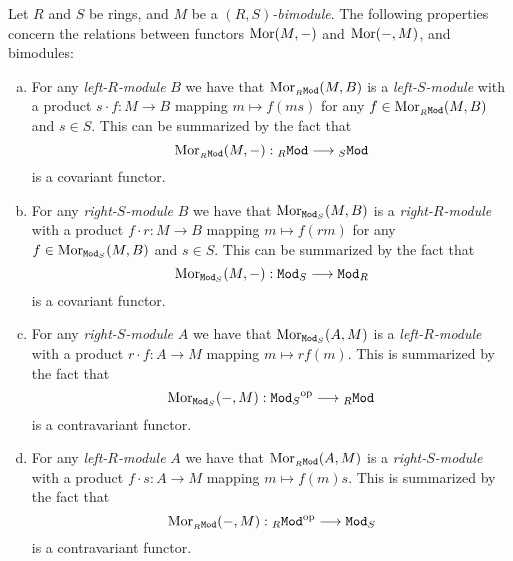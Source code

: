 \begin{proposition}
    \label{prop:hom-functor-and-bimodules}
    Let \(R\) and \(S\) be rings, and \(M\) be a \emph{\((R, S)\)-bimodule}. The
    following properties concern the relations between functors \(\operatorname{Mor}(M, -)\) and
    \(\operatorname{Mor}(-, M)\), and bimodules:
    \begin{enumerate}[(a)]\setlength\itemsep{0em}
        \item For any \emph{left-\(R\)-module} \(B\) we have that
              \(\operatorname{Mor}_{{{}_{R}\texttt{Mod}}}(M, B)\) is a \emph{left-\(S\)-module} with a product
              \(s \cdot f: M \to B\) mapping \(m \mapsto f(m s)\) for any
              \(f \in \operatorname{Mor}_{{{}_{R}\texttt{Mod}}}(M, B)\) and \(s \in S\). This can be summarized by the
              fact that
              \[
                  \operatorname{Mor}_{{{}_{R}\texttt{Mod}}}(M, -): {{}_{R}\texttt{Mod}} \longrightarrow {{}_{S}\texttt{Mod}}
              \]
              is a covariant functor.

        \item For any \emph{right-\(S\)-module} \(B\) we have that
              \(\operatorname{Mor}_{{\texttt{Mod}_{S}}}(M, B)\) is a \emph{right-\(R\)-module} with a product
              \(f \cdot r: M \to B\) mapping \(m \mapsto f(r m)\) for any
              \(f \in \operatorname{Mor}_{{\texttt{Mod}_{S}}}(M, B)\) and \(s \in S\). This can be summarized by the
              fact that
              \[
                  \operatorname{Mor}_{{\texttt{Mod}_{S}}}(M, -): {\texttt{Mod}_{S}} \longrightarrow {\texttt{Mod}_{R}}
              \]
              is a covariant functor.

        \item For any \emph{right-\(S\)-module} \(A\) we have that \(\operatorname{Mor}_{{\texttt{Mod}_{S}}}(A,
              M)\) is a \emph{left-\(R\)-module} with a product \(r \cdot f: A \to M\)
              mapping \(m \mapsto r f(m)\). This is summarized by the fact that
              \[
                  \operatorname{Mor}_{{\texttt{Mod}_{S}}}(-, M): {\texttt{Mod}_{S}}^{\mathrm{op}} \longrightarrow {{}_{R}\texttt{Mod}}
              \]
              is a contravariant functor.

        \item For any \emph{left-\(R\)-module} \(A\) we have that \(\operatorname{Mor}_{{{}_{R}\texttt{Mod}}}(A,
              M)\) is a \emph{right-\(S\)-module} with a product \(f \cdot s: A \to M\)
              mapping \(m \mapsto f(m) s\). This is summarized by the fact that
              \[
                  \operatorname{Mor}_{{{}_{R}\texttt{Mod}}}(-, M): {{}_{R}\texttt{Mod}}^{\mathrm{op}} \longrightarrow {\texttt{Mod}_{S}}
              \]
              is a contravariant functor.
    \end{enumerate}
\end{proposition}

